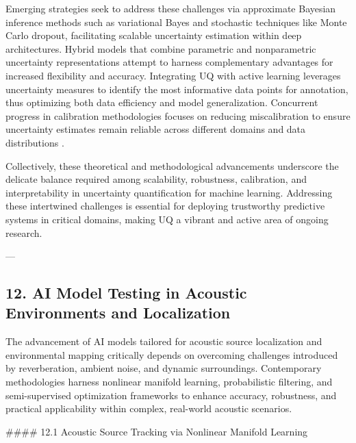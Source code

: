 \documentclass[11pt]{article}
\begin{document}
Emerging strategies seek to address these challenges via approximate Bayesian inference methods such as variational Bayes and stochastic techniques like Monte Carlo dropout, facilitating scalable uncertainty estimation within deep architectures. Hybrid models that combine parametric and nonparametric uncertainty representations attempt to harness complementary advantages for increased flexibility and accuracy. Integrating UQ with active learning leverages uncertainty measures to identify the most informative data points for annotation, thus optimizing both data efficiency and model generalization. Concurrent progress in calibration methodologies focuses on reducing miscalibration to ensure uncertainty estimates remain reliable across different domains and data distributions \cite{ref28}.

Collectively, these theoretical and methodological advancements underscore the delicate balance required among scalability, robustness, calibration, and interpretability in uncertainty quantification for machine learning. Addressing these intertwined challenges is essential for deploying trustworthy predictive systems in critical domains, making UQ a vibrant and active area of ongoing research.


---

\subsection{12. AI Model Testing in Acoustic Environments and Localization}

The advancement of AI models tailored for acoustic source localization and environmental mapping critically depends on overcoming challenges introduced by reverberation, ambient noise, and dynamic surroundings. Contemporary methodologies harness nonlinear manifold learning, probabilistic filtering, and semi-supervised optimization frameworks to enhance accuracy, robustness, and practical applicability within complex, real-world acoustic scenarios.

#### 12.1 Acoustic Source Tracking via Nonlinear Manifold Learning
\end{document}
